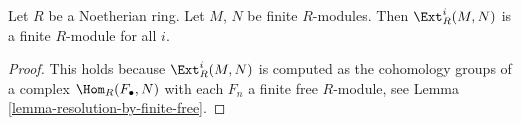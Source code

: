 \begin{lemma}
\label{lemma-ext-noetherian}
Let $R$ be a Noetherian ring. Let $M$, $N$ be finite $R$-modules.
Then $\Ext^i_R(M, N)$ is a finite $R$-module for all $i$.
\end{lemma}

\begin{proof}
This holds because $\Ext^i_R(M, N)$ is computed as the
cohomology groups of a complex $\Hom_R(F_\bullet, N)$
with each $F_n$ a finite free $R$-module, see
Lemma \ref{lemma-resolution-by-finite-free}.
\end{proof}




